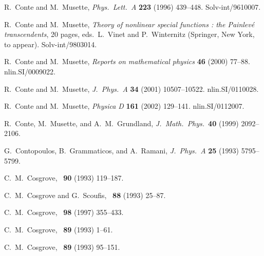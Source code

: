 \documentclass[10pt]{article}
\begin{document}
\begin{thebibliography}{99}
 R.~Conte and M.~Musette,
{\it Phys.~Lett.~A} {\bf 223} (1996) 439--448.
Solv-int/9610007.

 R.~Conte and M.~Musette,
{\it Theory of nonlinear special functions : the Painlev\'e transcendents}, 
20 pages, 
eds.~L.~Vinet and P.~Winternitz
(Springer, New York, to appear).
Solv-int/9803014. 

 R.~Conte and M.~Musette,
{\it Reports on mathematical physics} {\bf 46} (2000) 77--88.
nlin.SI/0009022. 

 R.~Conte and M.~Musette, 
{\it J.~Phys.~A} {\bf 34} (2001) 10507--10522. nlin.SI/0110028.

 R.~Conte and M.~Musette,
{\it Physica D} {\bf 161} (2002) 129--141. nlin.SI/0112007.

 R.~Conte, M.~Musette, and A.~M.~Grundland,
{\it J.~Math.~Phys.}~{\bf 40} (1999) 2092--2106.

 G.~Contopoulos, B.~Grammaticos, and A.~Ramani,
{\it J.~Phys.~A} {\bf 25} (1993) 5795--5799.

 C.~M.~Cosgrove,
{\it \SAM}~{\bf 90} (1993) 119--187.

 C.~M.~Cosgrove and G.~Scoufis,
{\it \SAM}~{\bf 88} (1993) 25--87.

 C.~M.~Cosgrove,
{\it \SAM}~{\bf 98} (1997) 355--433.

 C.~M.~Cosgrove,
{\it \SAM}~{\bf 89} (1993) 1--61.
 
 C.~M.~Cosgrove,
{\it \SAM}~{\bf 89} (1993) 95--151.
 

\end{thebibliography}
\end{document}

